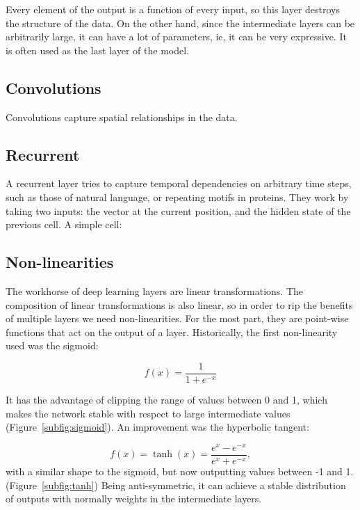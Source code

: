 Every element of the output is a function of every input, so this layer destroys the structure of the data.
On the other hand, since the intermediate layers can be arbitrarily large, it can have a lot of parameters, ie, it can be very expressive.
It is often used as the last layer of the model.

\subsection{Convolutions}
Convolutions capture spatial relationships in the data.

\subsection{Recurrent}
A recurrent layer tries to capture temporal dependencies on arbitrary time steps, such as those of natural language, or repeating motifs in proteins.
They work by taking two inputs: the vector at the current position, and the hidden state of the previous cell.
A simple cell:


\subsection{Non-linearities}
The workhorse of deep learning layers are linear transformations.
The composition of linear transformations is also linear, so in order to rip the benefits of multiple layers we need non-linearities.
For the most part, they are point-wise functions that act on the output of a layer.
Historically, the first non-linearity used was the sigmoid:

\begin{equation*}
f(x) = \frac{1}{1 + e^{- x}}
\end{equation*}

It has the advantage of clipping the range of values between 0 and 1, which makes the network stable with respect to large intermediate values (Figure~\ref{subfig:sigmoid}).
An improvement was the hyperbolic tangent:

\begin{equation*}
f(x) = \tanh(x) = \frac{e^x - e^{-x}}{e^x + e^{-x}},
\end{equation*}
with a similar shape to the sigmoid, but now outputting values between -1 and 1. (Figure~\ref{subfig:tanh})
Being anti-symmetric, it can achieve a stable distribution of outputs with normally weights in the intermediate layers.

